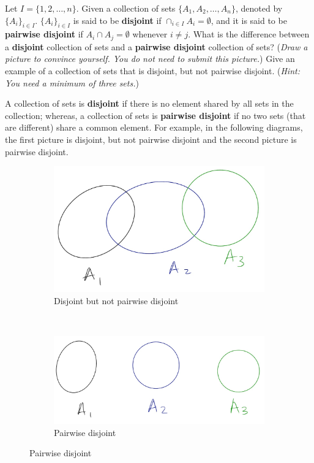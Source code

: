 \documentclass{article}
\theoremstyle{definition}
\begin{document}
\begin{question}
   Let $I=\{1, 2, \dots, n\}$. Given a collection of sets $\{A_1,A_2,\dots, A_n\}$, denoted by $\{A_i\}_{i\in I}$. $\{A_i\}_{i\in I}$ is said to be \textbf{disjoint} if $\cap_{i\in I}A_i=\emptyset$, and it is said to be \textbf{pairwise disjoint} if $A_i\cap A_j=\emptyset$ whenever $i\neq j$. What is the difference between a \textbf{disjoint} collection of sets and a \textbf{pairwise disjoint} collection of sets? (\textit{Draw a picture to convince yourself. You do not need to submit this picture.}) Give an example of a collection of sets that is disjoint, but not pairwise disjoint. (\textit{Hint: You need a minimum of three sets.})
\end{question}
\begin{solution}
A collection of sets is \textbf{disjoint} if there is no element shared by all sets in the collection; whereas, a collection of sets is \textbf{pairwise disjoint} if no two sets (that are different) share a common element. For example, in the following diagrams, the first picture is disjoint, but not pairwise disjoint and the second picture is pairwise disjoint.
\begin{figure}[h]
\centering
	\begin{subfigure}[h]{.35\textwidth}
	\includegraphics[width=\textwidth]{PS/disjoint.jpg}
	\caption{Disjoint but not pairwise disjoint}
	\end{subfigure}
	~\quad\hspace{1cm}
	\begin{subfigure}[h]{.35\textwidth}
	\includegraphics[width=\textwidth]{PS/pair-disjoint.jpg}
	\caption{Pairwise disjoint}
	\end{subfigure}	
\end{figure}



\end{solution}
\end{document}
